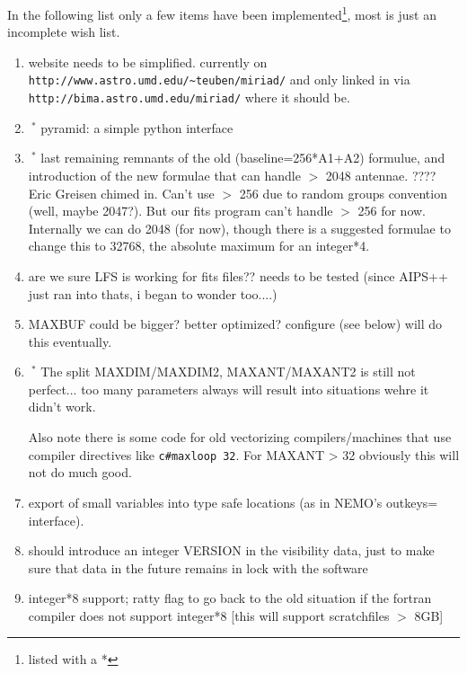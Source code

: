 In the following list only a few items have been 
implemented\footnote{listed with a *}, most is just an incomplete wish list.
\begin{enumerate}
\item
website needs to be simplified. currently on \newline
\verb+http://www.astro.umd.edu/~teuben/miriad/+
and only linked in via \newline
\verb+http://bima.astro.umd.edu/miriad/+ where it should be.

\item
$\ ^{*}$
pyramid: a simple python interface

\item
$\ ^{*}$
last remaining remnants of the old (baseline=256*A1+A2) formulue, and introduction
of the new formulae that can handle $>$ 2048 antennae. ????   Eric Greisen chimed
in. Can't use $>$ 256 due to random groups convention (well, maybe 2047?). But
our fits program can't handle $>$ 256 for now. Internally we can do 2048 (for now),
though there is a suggested formulae to change this to 32768, the absolute
maximum for an integer*4.

\item
are we sure LFS is working for fits files?? needs to be tested  (since AIPS++
just ran into thats, i began to wonder too....)

\item
MAXBUF  could be bigger? better optimized? configure (see below) will do this
eventually.

\item
$\ ^{*}$
The split MAXDIM/MAXDIM2, MAXANT/MAXANT2 is still not perfect... too many parameters
always will result into situations wehre it didn't work.

Also note there is some code for old vectorizing compilers/machines that use
compiler directives like \verb+c#maxloop 32+. For MAXANT > 32 obviously this
will not do much good.

\item 
export of small variables into type safe locations (as in NEMO's outkeys= interface).

\item
should introduce an integer VERSION in the visibility data, just to make sure
that data in the future remains in lock with the software

\item
integer*8 support; ratty flag to go back to the old situation if
the fortran compiler does not support integer*8
[this will support scratchfiles $>$ 8GB]


\end{enumerate}
